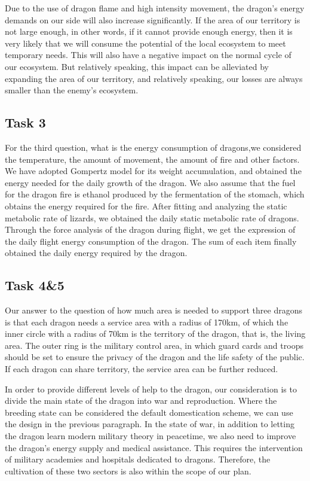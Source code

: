 \documentclass[12pt]{article}  %
\begin{document}
Due to the use of dragon flame and high intensity movement, the dragon's energy demands on our side will also increase significantly. If the area of our territory is not large enough, in other words, if it cannot provide enough energy, then it is very likely that we will consume the potential of the local ecosystem to meet temporary needs. This will also have a negative impact on the normal cycle of our ecosystem. But relatively speaking, this impact can be alleviated by expanding the area of our territory, and relatively speaking, our losses are always smaller than the enemy's ecosystem.
\subsection{Task 3}
\vspace{-0.3cm}
For the third question, what is the energy consumption of dragons,we considered the temperature, the amount of movement, the amount of fire and other factors. We have adopted Gompertz model for its weight accumulation, and obtained the energy needed for the daily growth of the dragon. We also assume that the fuel for the dragon fire is ethanol produced by the fermentation of the stomach, which obtains the energy required for the fire. After fitting and analyzing the static metabolic rate of lizards, we obtained the daily static metabolic rate of dragons. Through the force analysis of the dragon during flight, we get the expression of the daily flight energy consumption of the dragon. The sum of each item finally obtained the daily energy required by the dragon.

\subsection{Task 4\&5}
\vspace{-0.3cm}

Our answer to the question of how much area is needed to support three dragons is that each dragon needs a service area with a radius of 170km, of which the inner circle with a radius of 70km is the territory of the dragon, that is, the living area. The outer ring is the military control area, in which guard cards and troops should be set to ensure the privacy of the dragon and the life safety of the public. If each dragon can share territory, the service area can be further reduced.

In order to provide different levels of help to the dragon, our consideration is to divide the main state of the dragon into war and reproduction. Where the breeding state can be considered the default domestication scheme, we can use the design in the previous paragraph. In the state of war, in addition to letting the dragon learn modern military theory in peacetime, we also need to improve the dragon's energy supply and medical assistance. This requires the intervention of military academies and hospitals dedicated to dragons. Therefore, the cultivation of these two sectors is also within the scope of our plan.
\end{document}
